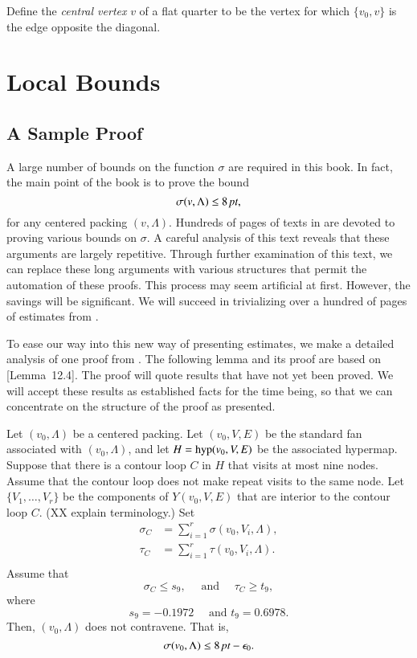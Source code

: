 \begin{definition}
Define the {\it central vertex\/} $v$ of a flat quarter to be the
vertex for which $\{v_0,v\}$ is the edge opposite the diagonal.
\end{definition}








\chapter{Local Bounds}



\section{A Sample Proof}

A large number of bounds on the function
$\sigma$ are required in this book.  In fact, the main
point of the book is to prove the bound
  $$
  \sigma(v,\Lambda)\le 8\,\hbox{\it pt},
  $$
for any centered packing $(v,\Lambda)$.
Hundreds of pages of texts in \cite{DCG} are devoted to
proving various bounds on $\sigma$.  A careful analysis of
this text reveals that these arguments are largely repetitive.
Through further examination of this text, we can replace these
long arguments with various structures that permit the automation
of these proofs.  This process may seem artificial at first.
However, the savings will be significant.  We will succeed in
trivializing over a hundred of pages of estimates from \cite{DCG}.

To ease our way into this new way of presenting estimates, 
we make a detailed analysis of
one proof from \cite{DCG}.  The following lemma and its proof are
based on \cite{DCG}[Lemma~12.4].  The proof will quote results that
have not yet been proved.  We will accept these results 
as established facts for the time being, 
so that we can concentrate on the structure
of the proof as presented.


\begin{lemma}\label{lemma:nonagon}  
Let $(v_0,\Lambda)$ be a centered packing.
Let $(v_0,V,E)$ be the standard fan associated with $(v_0,\Lambda)$,
and let $H={\operatorname{hyp}}(v_0,V,E)$ be the associated hypermap.  
Suppose that there is a contour loop $C$ in $H$ that visits
at most nine nodes.  Assume that the contour loop does not make
repeat visits to the same node.
Let $\{V_1,\ldots,V_r\}$ be the components of $Y(v_0,V,E)$ that
are interior to the contour loop $C$.  (XX explain terminology.)
Set 
   $$
   \begin{array}{lll}
   \sigma_C &= \sum_{i=1}^r \sigma(v_0,V_i,\Lambda),\\
   \tau_C &= \sum_{i=1}^r \tau(v_0,V_i,\Lambda).\\
   \end{array}
   $$
Assume that
    $$
    \sigma_C \le s_9,\quad \text{ and } \quad \tau_C \ge t_9,
    $$
where 
    $$
    s_9 = -0.1972 \quad \text{ and } t_9 = 0.6978.
    $$
Then, $(v_0,\Lambda)$ does not contravene.  That is,
$$
\sigma(v_0,\Lambda) \le 8\,\hbox{\it pt} - \epsilon_0.
$$
\end{lemma}

